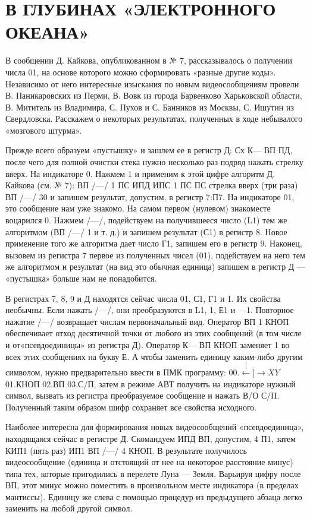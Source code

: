 \documentclass[11pt,a4paper,oneside]{article}
\def\XY{$\stackrel[\leftarrow]{\rightarrow}{XY}$}
\begin{document}
\section{В ГЛУБИНАХ «ЭЛЕКТРОННОГО ОКЕАНА»}
В сообщении Д. Кайкова, опубликованном в № 7, рассказывалось о получении числа 01, на основе которого можно сформировать «разные другие коды». Независимо от него интересные изыскания по новым видеосообщениям провели В. Паникаровских из Перми, В. Вовк из города Барвенково Харьковской области, В. Мититель из Владимира, С. Пухов и С. Банников из Москвы, С. Ишутин из Свердловска. Расскажем о некоторых результатах, полученных в ходе небывалого «мозгового штурма».

Прежде всего образуем «пустышку» и зашлем ее в регистр Д: Сх К— ВП ПД, после чего для полной очистки стека нужно несколько раз подряд нажать стрелку вверх. На индикаторе 0. Нажмем 1 и применим к этой цифре алгоритм Д. Кайкова (см. № 7): ВП /—/ 1 ПС ИПД ИПС 1 ПС ПС стрелка вверх (три раза) ВП /—/ 30 и запишем результат, допустим, в регистр 7:П7. На индикаторе 01, это сообщение нам уже знакомо. На самом первом (нулевом) знакоместе воцарился 0. Нажмем /—/, подействуем на получившееся число (L1) тем же алгоритмом (ВП /—/ 1 и т. д.) и запишем результат (С1) в регистр 8. Новое применение того же алгоритма дает число Г1, запишем его в регистр 9. Наконец, вызовем из регистра 7 первое из полученных чисел (01), подействуем на него тем же алгоритмом и результат (на вид это обычная единица) запишем в регистр Д — «пустышка» больше нам не понадобится.

В регистрах 7, 8, 9 и Д находятся сейчас числа 01, С1, Г1 и 1. Их свойства необычны. Если нажать /—/, они преобразуются в L1, 1, Е1 и —1. Повторное нажатие /—/ возвращает числам первоначальный вид. Оператор ВП 1 КНОП обеспечивает отход десятичной точки от любого из этих сообщений (в том числе и от«псевдоединицы» из регистра Д). Оператор К— ВП КНОП заменяет 1 во всех этих сообщениях на букву Е. А чтобы заменить единицу каким-либо другим символом, нужно предварительно ввести в ПМК программу: 00.\XY 01.КНОП 02.ВП 03.С/П, затем в режиме АВТ получить на индикаторе нужный символ, вызвать из регистра преобразуемое сообщение и нажать В/О С/П. Полученный таким образом шифр сохраняет все свойства исходного.

Наиболее интересна для формирования новых видеосообщений «псевдоединица», находящаяся сейчас в регистре Д. Скомандуем ИПД ВП, допустим, 4 П1, затем КИП1 (пять раз) ИП1 ВП /—/ 4 КНОП. В результате получилось видеосообщение (единица и отстоящий от нее на некоторое расстояние минус) типа тех, которые пригодились в перелете Луна — Земля. Варьируя цифру после ВП, этот минус можно поместить в произвольном месте индикатора (в пределах мантиссы). Единицу же слева с помощью процедур из предыдущего абзаца легко заменить на любой другой символ.
\end{document}
